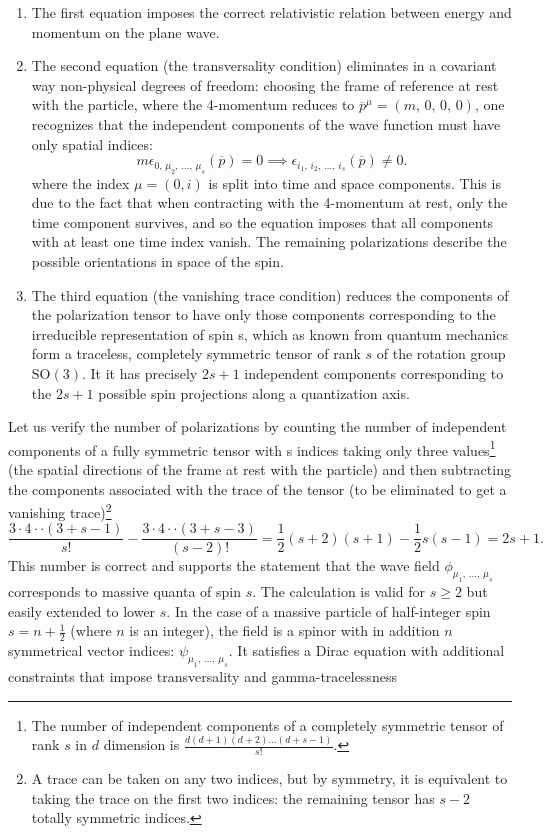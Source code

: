 \begin{enumerate}
    \item The first equation imposes the correct relativistic relation between energy and momentum on the plane wave.
    \item The second equation (the transversality condition) eliminates in a covariant way non-physical degrees of freedom: choosing the frame of reference at rest with the particle, where the 4-momentum reduces to \(\overline{p}^{\mu} = (m,\,0,\,0,\,0)\), one recognizes that the independent components of the wave function must have only spatial indices:
          \[
              m \epsilon_{0,\,\mu_2,\,\dots,\,\mu_s}(\overline{p}) = 0 \implies \epsilon_{i_1,\,i_2,\,\dots,\,i_s}(\overline{p}) \neq 0.
          \]
          where the index \(\mu = (0,i)\) is split into time and space components. This is due to the fact that when contracting with the 4-momentum at rest, only the time component survives, and so the equation imposes that all components with at least one time index vanish.
          The remaining polarizations describe the possible orientations in space of the spin.
    \item The third equation (the vanishing trace condition) reduces the components of the polarization tensor to have only those components corresponding to the irreducible representation of spin s, which as known from quantum mechanics form a traceless, completely symmetric tensor of rank \(s\) of the rotation group \(\mathrm{SO}(3)\). It it has precisely \(2s+1\) independent components corresponding to the \(2s + 1\) possible spin projections along a quantization axis.
\end{enumerate}
Let us verify the number of polarizations by counting the number of independent components of a fully symmetric tensor with s indices taking only three values\footnote{The number of independent components of a completely symmetric tensor of rank \(s\) in \(d\) dimension is \(\frac{d(d+1)(d+2)\dots(d+s-1)}{s!}\).} (the spatial directions of the frame at rest with the particle) and then subtracting the components associated with the trace of the tensor (to be eliminated to get a vanishing trace)\footnote{A  trace can be taken on any two indices, but by symmetry, it is equivalent to taking the trace on the first two indices: the remaining tensor has \(s-2\) totally symmetric indices.}
\[
    \frac{3 \cdot 4 \cdot \cdot (3+s-1)}{s!}-\frac{3\cdot 4 \cdot \cdot (3+s-3)}{(s-2)!} = \frac{1}{2} (s+2)(s+1) - \frac{1}{2} s (s-1) = 2s + 1.
\]
This number is correct and supports the statement that the wave field \(\phi_{\mu_1,\,\dots,\,\mu_s}\) corresponds to massive quanta of spin \(s\). The calculation is valid for \(s\geq 2\) but easily extended to lower \(s\). In the case of a massive particle of half-integer spin \(s=n+\tfrac12\) (where \(n\) is an integer), the field is a spinor with in addition \(n\) symmetrical vector indices: \(\psi_{\mu_1,\,\dots,\,\mu_s}\). It satisfies a Dirac equation with additional constraints that impose transversality and gamma-tracelessness
